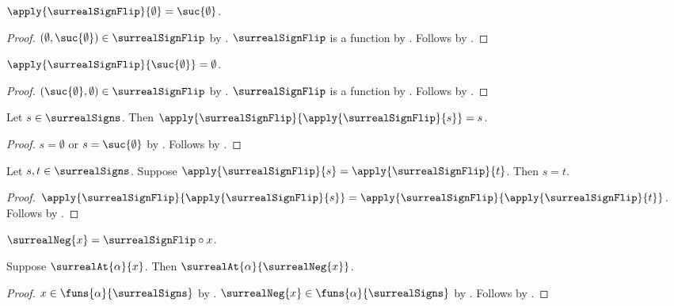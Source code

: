 \begin{proposition}\label{surreal_sign_flip_zero}
    $\apply{\surrealSignFlip}{\emptyset}=\suc{\emptyset}$.
\end{proposition}
\begin{proof}
    $(\emptyset,\suc{\emptyset})\in\surrealSignFlip$
        by .
    $\surrealSignFlip$ is a function
        by .
    Follows by .
\end{proof}

\begin{proposition}\label{surreal_sign_flip_one}
    $\apply{\surrealSignFlip}{\suc{\emptyset}}=\emptyset$.
\end{proposition}
\begin{proof}
    $(\suc{\emptyset},\emptyset)\in\surrealSignFlip$
        by .
    $\surrealSignFlip$ is a function
        by .
    Follows by .
\end{proof}

\begin{proposition}\label{surreal_sign_flip_involutive}
    Let $s\in\surrealSigns$.
    Then $\apply{\surrealSignFlip}{\apply{\surrealSignFlip}{s}}=s$.
\end{proposition}
\begin{proof}
    $s=\emptyset$ or $s=\suc{\emptyset}$
        by .
    Follows by .
\end{proof}

\begin{proposition}\label{surreal_sign_flip_injective}
    Let $s,t\in\surrealSigns$.
    Suppose $\apply{\surrealSignFlip}{s}=
        \apply{\surrealSignFlip}{t}$.
    Then $s=t$.
\end{proposition}
\begin{proof}
    $\apply{\surrealSignFlip}{\apply{\surrealSignFlip}{s}}
        =\apply{\surrealSignFlip}{\apply{\surrealSignFlip}{t}}$.
    Follows by .
\end{proof}

\begin{definition}\label{surreal_negation}
    $\surrealNeg{x}=\surrealSignFlip\circ x$.
\end{definition}

\begin{proposition}\label{surreal_negation_at}
    Suppose $\surrealAt{\alpha}{x}$.
    Then $\surrealAt{\alpha}{\surrealNeg{x}}$.
\end{proposition}
\begin{proof}
    $x\in\funs{\alpha}{\surrealSigns}$
        by .
    $\surrealNeg{x}\in\funs{\alpha}{\surrealSigns}$
        by .
    Follows by .
\end{proof}

